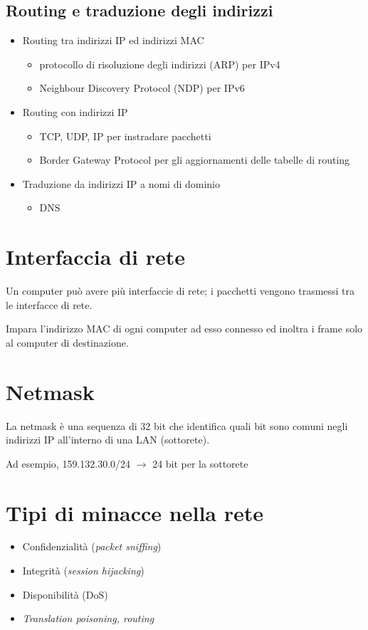 \subsection{Routing e traduzione degli indirizzi}
\begin{itemize}
    \item Routing tra indirizzi IP ed indirizzi MAC 
    \begin{itemize}
        \item protocollo di risoluzione degli indirizzi (ARP) per IPv4 
        \item Neighbour Discovery Protocol (NDP) per IPv6
    \end{itemize}
    \item Routing con indirizzi IP 
    \begin{itemize}
        \item TCP, UDP, IP per instradare pacchetti 
        \item Border Gateway Protocol per gli aggiornamenti delle tabelle di routing 
    \end{itemize}
    \item Traduzione da indirizzi IP a nomi di dominio 
    \begin{itemize}
        \item DNS
    \end{itemize}
\end{itemize}

\section{Interfaccia di rete}
Un computer può avere più interfaccie di rete; i pacchetti vengono trasmessi tra le interfacce 
di rete.



\noindent Impara l'indirizzo MAC di ogni computer ad esso connesso ed inoltra i frame solo al 
computer di destinazione.

\section{Netmask}
La netmask è una sequenza di 32 bit che identifica quali bit sono comuni negli indirizzi IP 
all'interno di una LAN (sottorete).

Ad esempio, 159.132.30.0/24 $\rightarrow$ 24 bit per la sottorete

\section{Tipi di minacce nella rete}
\begin{itemize}
    \item Confidenzialità (\textit{packet sniffing})
    \item Integrità (\textit{session hijacking})
    \item Disponibilità (DoS)
    \item \textit{Translation poisoning, routing}
\end{itemize}

